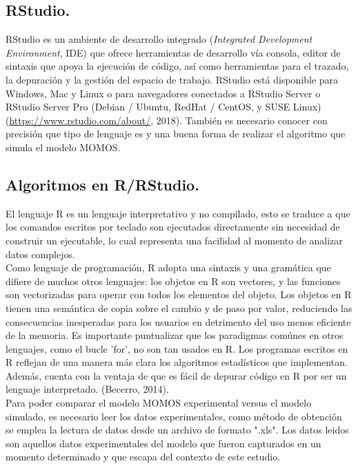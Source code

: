\subsection{RStudio.}

RStudio es un ambiente de desarrollo integrado (\textit{Integrated Development Environment}, IDE) que ofrece herramientas de desarrollo vía consola, editor de sintaxis que apoya la ejecución de código, así como herramientas para el trazado, la depuración y la gestión del espacio de trabajo.  RStudio está disponible para Windows, Mac y Linux o para navegadores conectados a RStudio Server o RStudio Server Pro (Debian / Ubuntu, RedHat / CentOS, y SUSE Linux) (\url{https://www.rstudio.com/about/}, 2018). Tambi\'en es necesario conocer con precisi\'on que tipo de lenguaje es y una buena forma de realizar el algoritmo que simula el modelo MOMOS.\\
 
 \subsection{Algoritmos en R/RStudio.}
 
El lenguaje R es un lenguaje interpretativo y no compilado, esto se traduce a que los comandos escritos por teclado son ejecutados directamente sin necesidad de construir un ejecutable, lo cual representa una facilidad al momento de analizar datos complejos. \\

Como lenguaje de programación, R adopta una sintaxis y una gramática que difiere de muchos otros lenguajes: los objetos en R son vectores, y las funciones son vectorizadas para operar con todos los elementos del objeto. Los objetos en R tienen una semántica de copia sobre el cambio y de paso por valor, reduciendo las consecuencias inesperadas para los usuarios en detrimento del uso menos eficiente de la memoria. Es importante puntualizar que los paradigmas comúnes en otros lenguajes, como el bucle ’for’, no son tan usados en R. Los programas escritos en R reflejan de una manera más clara los algoritmos estadísticos que implementan. Además, cuenta con la ventaja de que es fácil de depurar código en R por ser un lenguaje interpretado. (Becerro, 2014).\\

Para poder comparar el modelo MOMOS experimental versus el modelo simulado, es necesario leer los datos experimentales, como método de obtención se emplea la lectura de datos desde un archivo de formato ".xls". Los datos leidos son aquellos datos experimentales del modelo que fueron capturados en un momento determinado y que escapa del contexto de este estudio.\\

